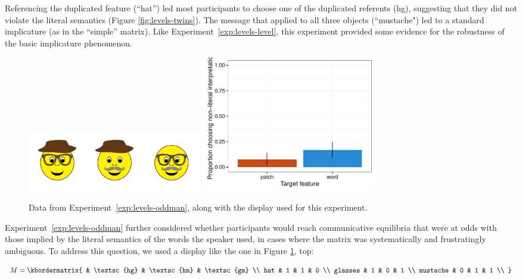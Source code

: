 \documentclass[man]{apa6}
\newcounter{Experiment}
\newcommand{\exptref}[1]{Experiment~\ref{#1}}
\begin{document}
Referencing the duplicated feature (``hat'') led most participants to choose one of the duplicated referents ({\sc hg}), suggesting that they did not violate the literal semantics (Figure \ref{fig:levels-twins}). The message that applied to all three objects (``mustache") led to a standard implicature (as in the ``simple'' matrix). Like \exptref{exp:levels-level}, this experiment provided some evidence for the robustness of the basic implicature phenomenon.

 \begin{figure}[t]
  \centering
  \includegraphics[width=3in]{figures/levels-oddman-stim.pdf}
  \includegraphics[width=3in]{../plots/3-levels-oddman.pdf}

  \caption{\label{fig:levels-oddman} Data from \exptref{exp:levels-oddman}, along with the display used for this experiment.}
\end{figure}

\exptref{exp:levels-oddman} further considered whether participants would reach communicative equilibria that were at odds with those implied by the literal semantics of the words the speaker used, in cases where the matrix was systematically and frustratingly ambiguous. To address this question, we used a display like the one in Figure \ref{fig:levels-oddman}, top:

\begin{equation}
    M = \kbordermatrix{
               & \textsc{hg} & \textsc{hm} & \textsc{gm} \\
      hat      & 1  & 1  & 0  \\
      glasses  & 1  & 0  & 1 \\
      mustache & 0  & 1  & 1 \\
    }
\end{equation}
\end{document}
